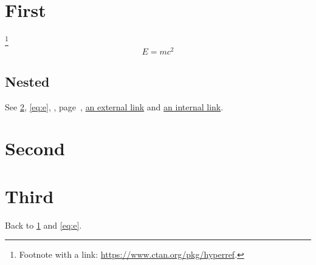 \documentclass{article}
\begin{document}
\tableofcontents
\section{First}\label{sec:first}
\lipsum[1]\footnote{Footnote with a link: \url{https://www.ctan.org/pkg/hyperref}.}
\begin{equation}E=mc^2\label{eq:e}\end{equation}
\subsection{Nested}\label{sec:nested}
See \cref{sec:second}, \autoref{eq:e}, , page~\pageref{sec:second}, \href{https://example.org}{an external link} and \hyperref[sec:first]{an internal link}.
\section{Second}\label{sec:second}
\lipsum[2-4]
\section{Third}
Back to \cref{sec:first} and \eqref{eq:e}.
\end{document}
